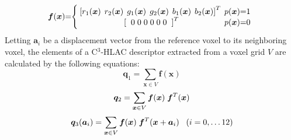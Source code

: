 \documentclass[letterpaper, 10 pt, conference]{sty/ieeeconf}
\begin{document}
\begin{eqnarray*}
  \bm{f}({\bm x})\hspace{-1mm}=\hspace{-1mm}\left\{
  \begin{array}{cc}
    \hspace{-1mm}
    \left[r_1({\bm x})\hspace{1.5mm} r_2(\bm{x}) \hspace{1.5mm}g_1({\bm x}) \hspace{1.5mm}g_2({\bm x}) \hspace{1.5mm}b_1({\bm x}) \hspace{1.5mm}b_2({\bm x})\right]^T & \hspace{-2mm}p({\bm x})\hspace{-1mm}=\hspace{-1mm}1 \\
    \left[\hspace{2mm} 0\hspace{1mm}0\hspace{1mm}0\hspace{1mm}0\hspace{1mm}0\hspace{1mm}0 \hspace{2mm} \right]^T & \hspace{-2mm}p({\bm x})\hspace{-1mm}=\hspace{-1mm}0
  \end{array}\right.
\end{eqnarray*}
%
Letting ${\bm a_i}$ be a displacement vector from the reference voxel to its neighboring voxel, 
the elements of a C$^3$-HLAC descriptor extracted from a voxel grid $V$ are calculated by the following equations:
\begin{equation}\label{eq:0th}
  {\bm q_1} = \sum_{{\bm x} \in V} \bm{f}({\bm x})
\end{equation}
\begin{equation}\label{eq:0th_1}
  {\bm q_2} = \sum_{{\bm x} \in V} \bm{f}({\bm x}) \hspace{1mm}\bm{f}^T({\bm x}) \\
\end{equation}
\begin{equation}\label{eq:1st}
  {\bm q_3}({\bm a}_i) = \sum_{{\bm x} \in V} \bm{f}({\bm x}) \hspace{1mm}\bm{f}^T({\bm x}+{\bm a_i}) \;\;\; (i=0, \dots 12) \\
\end{equation}
\end{document}
